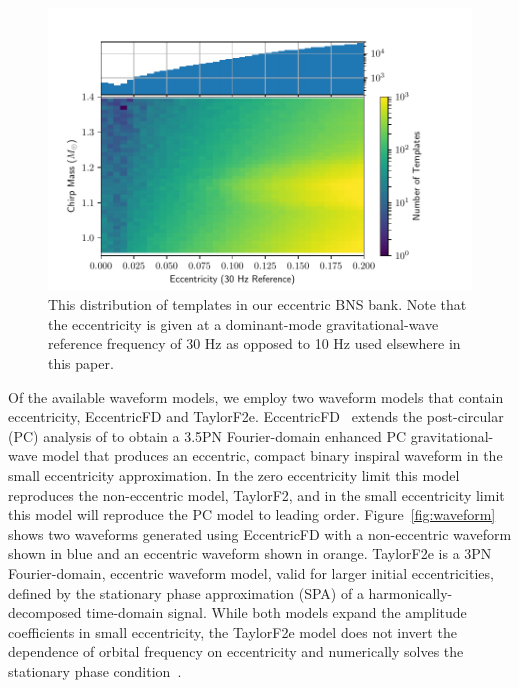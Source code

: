 \begin{figure}[t] 
  \centering
    \includegraphics[width=\textwidth]{Figures/eccentric-search/bank.pdf}
\caption{This distribution of templates in our eccentric BNS bank. Note that the eccentricity
is given at a dominant-mode gravitational-wave reference frequency of 30 Hz as opposed to 10 Hz used elsewhere in this paper.}
\label{fig:bank}
\end{figure}

Of the available waveform models, we employ two waveform models that contain eccentricity, EccentricFD and TaylorF2e. EccentricFD~\cite{Huerta:2014eca} extends the post-circular (PC) analysis of \cite{Yunes:2009yz} to obtain a 3.5PN Fourier-domain enhanced PC gravitational-wave model that produces an eccentric, compact binary inspiral waveform in the small eccentricity approximation.  In the zero eccentricity limit this model reproduces the non-eccentric model, TaylorF2, and in the small eccentricity limit this model will reproduce the PC model to leading order. Figure~\ref{fig:waveform} shows two waveforms generated using EccentricFD with a non-eccentric waveform shown in blue and an eccentric waveform shown in orange. TaylorF2e is a 3PN Fourier-domain, eccentric waveform model, valid for larger initial eccentricities, defined by the stationary phase approximation (SPA) of a harmonically-decomposed time-domain signal. While both models expand the amplitude coefficients in small eccentricity, the TaylorF2e model does not invert the dependence of orbital frequency on eccentricity and numerically solves the stationary phase condition~\cite{Moore:2018kvz,Moore:2019xkm,Moore:2019vjj}.

